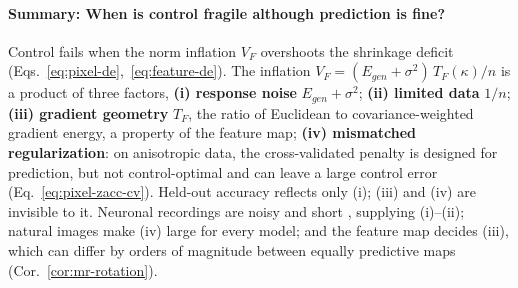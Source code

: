 \paragraph{Summary: When is control fragile although prediction is fine?}
Control fails when the norm inflation $V_F$ overshoots the shrinkage deficit (Eqs.~\ref{eq:pixel-de},~\ref{eq:feature-de}). 
The inflation $V_F=(E_{gen}+\sigma^2)\,T_F(\kappa)/n$ is a product of three factors, 
\textbf{(i) response noise} $E_{gen}+\sigma^2$;
\textbf{(ii) limited data} $1/n$;
\textbf{(iii) gradient geometry} $T_F$, the ratio of Euclidean to covariance-weighted gradient energy, a property of the feature map;
\textbf{(iv) mismatched regularization}: on anisotropic data, the cross-validated penalty is designed for prediction, but not control-optimal and can leave a large control error  (Eq.~\ref{eq:pixel-zacc-cv}).
Held-out accuracy reflects only (i); (iii) and (iv) are invisible to it. Neuronal recordings are noisy and short \citep{goris2014partitioning,churchland2010stimulus}, supplying (i)--(ii); natural images make (iv) large for every model; and the feature map decides (iii), which can differ by orders of magnitude between equally predictive maps (Cor.~\ref{cor:mr-rotation}).


